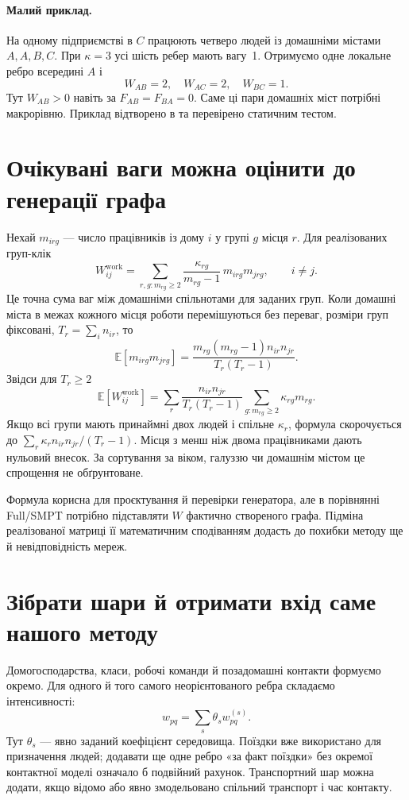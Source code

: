 \documentclass[11pt,a4paper]{article}
\begin{document}
\paragraph{Малий приклад.} На одному підприємстві в $C$ працюють четверо людей із домашніми містами $A,A,B,C$. При $\kappa=3$ усі шість ребер мають вагу~1. Отримуємо одне локальне ребро всередині $A$ і
\[
W_{AB}=2,\quad W_{AC}=2,\quad W_{BC}=1.
\]
Тут $W_{AB}>0$ навіть за $F_{AB}=F_{BA}=0$. Саме ці пари домашніх міст потрібні макрорівню. Приклад відтворено в  та перевірено статичним тестом.

\section{Очікувані ваги можна оцінити до генерації графа}
Нехай $m_{irg}$ --- число працівників із дому $i$ у групі $g$ місця $r$. Для реалізованих груп-клік
\begin{equation}
W_{ij}^{\mathrm{work}}=
 \sum_{r,g:m_{rg}\geq2}\frac{\kappa_{rg}}{m_{rg}-1}\,m_{irg}m_{jrg},\qquad i\ne j.
\label{eq:realized}
\end{equation}
Це точна сума ваг між домашніми спільнотами для заданих груп. Коли домашні міста в межах кожного місця роботи перемішуються без переваг, розміри груп фіксовані, $T_r=\sum_i n_{ir}$, то
\[
\mathbb E[m_{irg}m_{jrg}]
=\frac{m_{rg}(m_{rg}-1)n_{ir}n_{jr}}{T_r(T_r-1)}.
\]
Звідси для $T_r\geq2$
\begin{equation}
\mathbb E[W_{ij}^{\mathrm{work}}]=
\sum_r\frac{n_{ir}n_{jr}}{T_r(T_r-1)}
\sum_{g:m_{rg}\geq2}\kappa_{rg}m_{rg}.
\label{eq:expected}
\end{equation}
Якщо всі групи мають принаймні двох людей і спільне $\kappa_r$, формула скорочується до $\sum_r\kappa_r n_{ir}n_{jr}/(T_r-1)$. Місця з менш ніж двома працівниками дають нульовий внесок. За сортування за віком, галуззю чи домашнім містом це спрощення не обґрунтоване.

Формула корисна для проєктування й перевірки генератора, але в порівнянні Full/SMPT потрібно підставляти $W$ фактично створеного графа. Підміна реалізованої матриці її математичним сподіванням додасть до похибки методу ще й невідповідність мереж.

\section{Зібрати шари й отримати вхід саме нашого методу}
Домогосподарства, класи, робочі команди й позадомашні контакти формуємо окремо. Для одного й того самого неорієнтованого ребра складаємо інтенсивності:
\[
w_{pq}=\sum_s\theta_s w_{pq}^{(s)}.
\]
Тут $\theta_s$ --- явно заданий коефіцієнт середовища. Поїздки вже використано для призначення людей; додавати ще одне ребро «за факт поїздки» без окремої контактної моделі означало б подвійний рахунок. Транспортний шар можна додати, якщо відомо або явно змодельовано спільний транспорт і час контакту.
\end{document}
